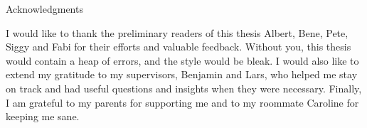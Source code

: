 \thispagestyle{empty}

\vspace*{20mm}

\begin{center}
{ Acknowledgments}
\end{center}

\vspace{10mm}

I would like to thank the preliminary readers of this thesis Albert, Bene, Pete, Siggy and Fabi for their efforts and valuable feedback.
Without you, this thesis would contain a heap of errors, and the style would be bleak.
I would also like to extend my gratitude to my supervisors, Benjamin and Lars, who helped me stay on track and had useful questions and insights when they were necessary.
Finally, I am grateful to my parents for supporting me and to my roommate Caroline for keeping me sane.

\cleardoublepage{}
